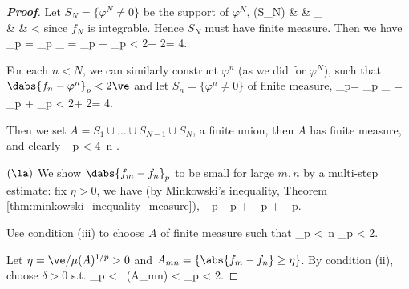 \begin{proof}[\bf Proof]
Let $S_N=\{\varphi^N \neq 0\}$ be the support of $\varphi^N$,
\beast
\mu(S_N) & \leq & _{}\mu{} \\
& \leq & \mu{} \leq {}\mu{} < \infty
\eeast
since $f_N$ is integrable. Hence $S_N$ must have finite measure. Then we have
\be
{}_p = _p _{} = _p + _p < 2\ve + 2\ve = 4\ve.
\ee	

For each $n<N$, we can similarly construct $\varphi^n$ (as we did for $\varphi^N$), such that $\dabs{f_n-\varphi^n}_p<2\ve$ and let $S_n = \{\varphi^n \neq 0\}$ of finite measure,
\be
{}_p= _p _{} = _p + _p < 2\ve + 2\ve = 4\ve.
\ee

Then we set $A = S_1 \cup \dots \cup S_{N-1} \cup S_N$, a finite union, then $A$ has finite measure, and clearly
\be
{}_p < 4\ve\ n .
\ee
\een

$(\la)$ We show $\dabs{f_m-f_n}_p$ to be small for large $m,n$ by a multi-step estimate: fix $\eta>0$, we have (by Minkowski's inequality, Theorem \ref{thm:minkowski_inequality_measure}),
\be
{}_p \leq {}_p + _p + _p.
\ee

Use condition (iii) to choose $A$ of finite measure such that
\be
{}_p <\ve \ n \quad\ra\quad {}_p < 2\ve.
\ee

Let $\eta = \ve/\mu(A)^{1/p} >0$ and $A_{mn} = \{\abs{f_m - f_n}\geq \eta\}$. By condition (ii), choose $\delta>0$ s.t.
\be
{}_p < \ve \quad {}\ \mu(A_{mn}) < \delta \quad\ra\quad {}_p < 2\ve.
\ee


\end{proof}
